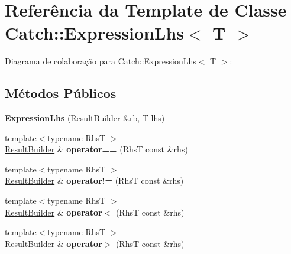 \hypertarget{classCatch_1_1ExpressionLhs}{}\section{Referência da Template de Classe Catch\+:\+:Expression\+Lhs$<$ T $>$}
\label{classCatch_1_1ExpressionLhs}


Diagrama de colaboração para Catch\+:\+:Expression\+Lhs$<$ T $>$\+:
\subsection*{Métodos Públicos}
\begin{DoxyCompactItemize}
\item 
{\bfseries Expression\+Lhs} (\hyperlink{classCatch_1_1ResultBuilder}{Result\+Builder} \&rb, T lhs)\hypertarget{classCatch_1_1ExpressionLhs_aa829588def6146a94fb75de9c4cc482a}{}\label{classCatch_1_1ExpressionLhs_aa829588def6146a94fb75de9c4cc482a}

\item 
{\footnotesize template$<$typename RhsT $>$ }\\\hyperlink{classCatch_1_1ResultBuilder}{Result\+Builder} \& {\bfseries operator==} (RhsT const \&rhs)\hypertarget{classCatch_1_1ExpressionLhs_a2f7ad442c3e5e5764eee736345c40301}{}\label{classCatch_1_1ExpressionLhs_a2f7ad442c3e5e5764eee736345c40301}

\item 
{\footnotesize template$<$typename RhsT $>$ }\\\hyperlink{classCatch_1_1ResultBuilder}{Result\+Builder} \& {\bfseries operator!=} (RhsT const \&rhs)\hypertarget{classCatch_1_1ExpressionLhs_a44df9974cf20fcfda4e5b6b3c01d5f93}{}\label{classCatch_1_1ExpressionLhs_a44df9974cf20fcfda4e5b6b3c01d5f93}

\item 
{\footnotesize template$<$typename RhsT $>$ }\\\hyperlink{classCatch_1_1ResultBuilder}{Result\+Builder} \& {\bfseries operator$<$} (RhsT const \&rhs)\hypertarget{classCatch_1_1ExpressionLhs_a48428d358ddc89729e2e3407f4024dac}{}\label{classCatch_1_1ExpressionLhs_a48428d358ddc89729e2e3407f4024dac}

\item 
{\footnotesize template$<$typename RhsT $>$ }\\\hyperlink{classCatch_1_1ResultBuilder}{Result\+Builder} \& {\bfseries operator$>$} (RhsT const \&rhs)\hypertarget{classCatch_1_1ExpressionLhs_ad3602a7ad945c751004065b1007dc183}{}\label{classCatch_1_1ExpressionLhs_ad3602a7ad945c751004065b1007dc183}


\end{DoxyCompactItemize}
